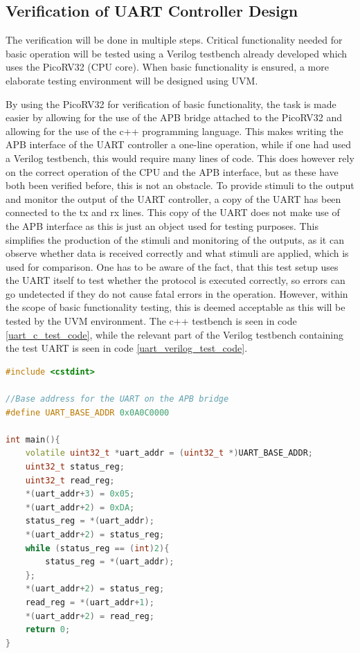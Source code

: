 \documentclass[./dissertation.tex]{subfiles}
\begin{document}
\subsection{Verification of UART Controller Design}
The verification will be done in multiple steps. Critical functionality needed for basic operation will be tested using a Verilog testbench already developed which uses the PicoRV32 (CPU core). When basic functionality is ensured, a more elaborate testing environment will be designed using UVM.

By using the PicoRV32 for verification of basic functionality, the task is made easier by allowing for the use of the APB bridge attached to the PicoRV32 and allowing for the use of the c++ programming language. This makes writing the APB interface of the UART controller a one-line operation, while if one had used a Verilog testbench, this would require many lines of code. This does however rely on the correct operation of the CPU and the APB interface, but as these have both been verified before, this is not an obstacle. To provide stimuli to the output and monitor the output of the UART controller, a copy of the UART has been connected to the tx and rx lines. This copy of the UART does not make use of the APB interface as this is just an object used for testing purposes. This simplifies the production of the stimuli and monitoring of the outputs, as it can observe whether data is received correctly and what stimuli are applied, which is used for comparison. One has to be aware of the fact, that this test setup uses the UART itself to test whether the protocol is executed correctly, so errors can go undetected if they do not cause fatal errors in the operation. However, within the scope of basic functionality testing, this is deemed acceptable as this will be tested by the UVM environment. The c++ testbench is seen in code \ref{uart_c_test_code}, while the relevant part of the Verilog testbench containing the test UART is seen in code \ref{uart_verilog_test_code}. 

\begin{lstlisting}[caption={C++ code for basic functionality testing of the UART controller},label={uart_c_test_code},language=C++]
#include <cstdint>

//Base address for the UART on the APB bridge
#define UART_BASE_ADDR 0x0A0C0000

int main(){
    volatile uint32_t *uart_addr = (uint32_t *)UART_BASE_ADDR;
    uint32_t status_reg;
    uint32_t read_reg;
    *(uart_addr+3) = 0x05;
    *(uart_addr+2) = 0xDA;
    status_reg = *(uart_addr);
    *(uart_addr+2) = status_reg;
    while (status_reg == (int)2){
        status_reg = *(uart_addr);
    };
    *(uart_addr+2) = status_reg;
    read_reg = *(uart_addr+1);
    *(uart_addr+2) = read_reg;
    return 0;
}
\end{lstlisting}
\end{document}
